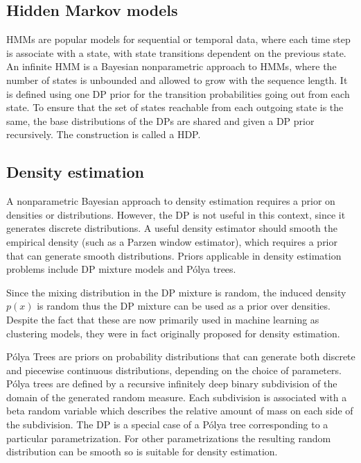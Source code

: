 \subsection{Hidden Markov models}
\glspl{HMM} are popular models for sequential or temporal data, where each time step is associate with a state, with state transitions dependent on the previous state. An infinite \gls{HMM} is a Bayesian nonparametric approach to \glspl{HMM}, where the number of states is unbounded and allowed to grow with the sequence length. It is defined using one \gls{DP} prior for the transition probabilities going out from each state. To ensure that the set of states reachable from each outgoing state is the same, the base distributions of the \glspl{DP} are shared and given a \gls{DP} prior recursively. The construction is called a \gls{HDP}.

\subsection{Density estimation}
A nonparametric Bayesian approach to density estimation requires a prior on densities or distributions. However, the \gls{DP} is not useful in this context, since it generates discrete distributions. A useful density estimator should smooth the empirical density (such as a Parzen window estimator), which requires a prior that can generate smooth distributions. Priors applicable in density estimation problems include \gls{DP} mixture models and Pólya trees.

Since the mixing distribution in the \gls{DP} mixture is random, the induced density $p(x)$ is random thus the \gls{DP} mixture can be used as a prior over densities. Despite the fact that these are now primarily used in machine learning as clustering models, they were in fact originally proposed for density estimation.

Pólya Trees are priors on probability distributions that can generate both discrete and piecewise continuous distributions, depending on the choice of parameters. Pólya trees are defined by a recursive infinitely deep binary subdivision of the domain of the generated random measure. Each subdivision is associated with a beta random variable which describes the relative amount of mass on each side of the subdivision. The \gls{DP} is a special case of a Pólya tree corresponding to a particular parametrization. For other parametrizations the resulting random distribution can be smooth so is suitable for density estimation.

